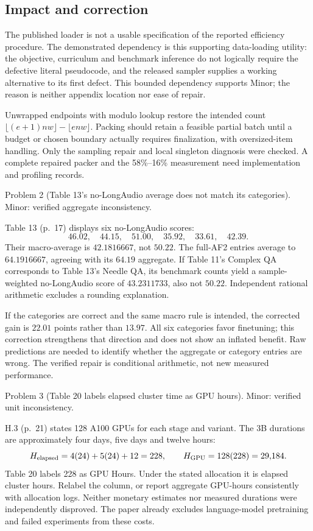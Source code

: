 \documentclass[10pt]{article}
\begin{document}
\subsection*{Impact and correction}
The published loader is not a usable specification of the reported efficiency procedure. The demonstrated dependency is this supporting data-loading utility: the objective, curriculum and benchmark inference do not logically require the defective literal pseudocode, and the released sampler supplies a working alternative to its first defect. This bounded dependency supports Minor; the reason is neither appendix location nor ease of repair.\par
Unwrapped endpoints with modulo lookup restore the intended count \(\lfloor(e+1)nw\rfloor-\lfloor enw\rfloor\). Packing should retain a feasible partial batch until a budget or chosen boundary actually requires finalization, with oversized-item handling. Only the sampling repair and local singleton diagnosis were checked. A complete repaired packer and the 58\%–16\% measurement need implementation and profiling records.\par
Problem 2 (Table 13’s no-LongAudio average does not match its categories).  Minor: verified aggregate inconsistency.\par
Table 13 (p. 17) displays six no-LongAudio scores: \[46.02,\quad44.15,\quad51.00,\quad35.92,\quad33.61,\quad42.39.\] Their macro-average is \(42.1816667\), not \(50.22\). The full-AF2 entries average to \(64.1916667\), agreeing with its \(64.19\) aggregate. If Table 11’s Complex QA corresponds to Table 13’s Needle QA, its benchmark counts yield a sample-weighted no-LongAudio score of \(43.2311733\), also not \(50.22\). Independent rational arithmetic excludes a rounding explanation.\par
If the categories are correct and the same macro rule is intended, the corrected gain is \(22.01\) points rather than \(13.97\). All six categories favor finetuning; this correction strengthens that direction and does not show an inflated benefit. Raw predictions are needed to identify whether the aggregate or category entries are wrong. The verified repair is conditional arithmetic, not new measured performance.\par
Problem 3 (Table 20 labels elapsed cluster time as GPU hours).  Minor: verified unit inconsistency.\par
H.3 (p. 21) states 128 A100 GPUs for each stage and variant. The 3B durations are approximately four days, five days and twelve hours: \[H_{\rm elapsed}=4(24)+5(24)+12=228,\qquad
 H_{\rm GPU}=128(228)=29{,}184.\] Table 20 labels 228 as GPU Hours. Under the stated allocation it is elapsed cluster hours. Relabel the column, or report aggregate GPU-hours consistently with allocation logs. Neither monetary estimates nor measured durations were independently disproved. The paper already excludes language-model pretraining and failed experiments from these costs.\par
\end{document}
